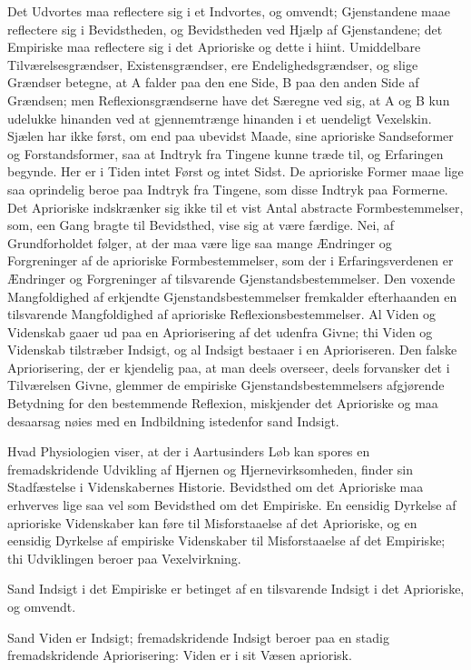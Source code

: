 \documentclass[12pt]{book}
\newcommand{\apage}[1]{\marginnote{\footnotesize\textit{[#1]}}}
\begin{document}
Det Udvortes maa reflectere sig i et Indvortes, og omvendt; Gjenstandene
maae reflectere sig i Bevidstheden, og Bevidstheden ved Hjælp af
Gjenstandene; det Empiriske maa reflectere sig i det Aprioriske og dette i
hiint. Umiddelbare Tilværelsesgrændser, Existensgrændser, ere
Endelighedsgrændser, og slige Grændser betegne, at A falder paa den ene
Side, B paa den anden Side af Grændsen; men Reflexionsgrændserne have det
Særegne ved sig, at A og B kun udelukke hinanden ved at gjennemtrænge
hinanden i et uendeligt Vexelskin. Sjælen har ikke først, om end paa
ubevidst Maade, sine aprioriske Sandseformer og Forstandsformer, saa at
Indtryk fra Tingene kunne træde til, og Erfaringen begynde. Her er i Tiden
intet Først og intet Sidst. De aprioriske Former maae lige saa oprindelig
beroe paa Indtryk fra Tingene, som disse Indtryk paa Formerne. Det
Aprioriske indskrænker sig ikke til et vist Antal abstracte
Formbestemmelser, som, een Gang bragte til Bevidsthed, vise sig \apage{39} at være
færdige. Nei, af Grundforholdet følger, at der maa være lige saa mange
Ændringer og Forgreninger af de aprioriske Formbestemmelser, som der i
Erfaringsverdenen er Ændringer og Forgreninger af tilsvarende
Gjenstandsbestemmelser. Den voxende Mangfoldighed af erkjendte
Gjenstandsbestemmelser fremkalder efterhaanden en tilsvarende
Mangfoldighed af aprioriske Reflexionsbestemmelser. Al Viden og Videnskab
gaaer ud paa en Apriorisering af det udenfra Givne; thi Viden og Videnskab
tilstræber Indsigt, og al Indsigt bestaaer i en Aprioriseren. Den falske
Apriorisering, der er kjendelig paa, at man deels overseer, deels
forvansker det i Tilværelsen Givne, glemmer de empiriske
Gjenstandsbestemmelsers afgjørende Betydning for den bestemmende
Reflexion, miskjender det Aprioriske og maa desaarsag nøies med en
Indbildning istedenfor sand Indsigt.

Hvad Physiologien viser, at der i Aartusinders Løb kan spores en
fremadskridende Udvikling af Hjernen og Hjernevirksomheden, finder sin
Stadfæstelse i Videnskabernes Historie. Bevidsthed om det Aprioriske maa
erhverves lige saa vel som Bevidsthed om det Empiriske. En eensidig
Dyrkelse af aprioriske Videnskaber kan føre til Misforstaaelse af det
Aprioriske, og en eensidig Dyrkelse af empiriske Videnskaber til
Misforstaaelse af det Empiriske; thi Udviklingen beroer paa Vexelvirkning.

Sand Indsigt i det Empiriske er betinget af en tilsvarende Indsigt i det
Aprioriske, og omvendt.

\apage{40} Sand Viden er Indsigt; fremadskridende Indsigt beroer paa en stadig
fremadskridende Apriorisering: Viden er i sit Væsen apriorisk.
\end{document}

